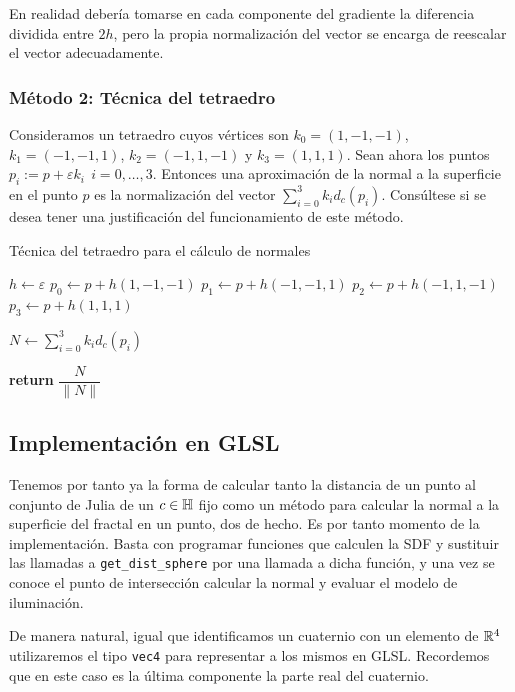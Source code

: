 En realidad debería tomarse en cada componente del gradiente la diferencia dividida entre $2h$, pero la propia normalización del vector se encarga de reescalar el vector adecuadamente.    

\subsubsection{Método 2: Técnica del tetraedro}

Consideramos un tetraedro cuyos vértices son $k_0=(1,-1,-1)$, $k_1=(-1,-1,1)$, $k_2=(-1,1,-1)$ y $k_3=(1,1,1)$. Sean ahora los puntos $p_i := p+\varepsilon k_i\ \ i=0,\dots,3$. Entonces una aproximación de la normal a la superficie en el punto $p$ es la normalización del vector $\sum_{i=0}^3 k_i d_c(p_i)$. Consúltese \cite{normals-sdf} si se desea tener una justificación del funcionamiento de este método.

\begin{algorithm}[H]
    \caption{Técnica del tetraedro para el cálculo de normales} \label{alg:normal-tetraedro}
    \begin{algorithmic}
    \State $h\gets\varepsilon$
    \State $p_0 \gets p + h(1,-1,-1)$
    \State $p_1 \gets p + h(-1,-1,1)$
    \State $p_2 \gets p + h(-1,1,-1)$
    \State $p_3 \gets p + h(1,1,1)$

    \State $N\gets \sum_{i=0}^3 k_i d_c(p_i)$

    \State \textbf{return} $\dfrac{N}{\|N\|}$
    \EndProcedure
    \end{algorithmic}
\end{algorithm}

\subsection{Implementación en GLSL}

Tenemos por tanto ya la forma de calcular tanto la distancia de un punto al conjunto de Julia de un $c\in\mathbb{H}$ fijo como un método para calcular la normal a la superficie del fractal en un punto, dos de hecho. Es por tanto momento de la implementación. Basta con programar funciones que calculen la SDF y sustituir las llamadas a \verb|get_dist_sphere| por una llamada a dicha función, y una vez se conoce el punto de intersección calcular la normal y evaluar el modelo de iluminación.

De manera natural, igual que identificamos un cuaternio con un elemento de $\mathbb{R}^4$ utilizaremos el tipo \verb|vec4| para representar a los mismos en GLSL. Recordemos que en este caso es la última componente la parte real del cuaternio.

